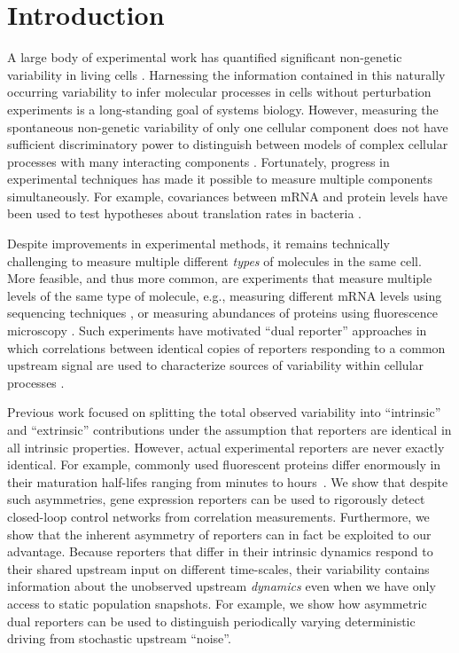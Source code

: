 \documentclass[%
 reprint,prx,
superscriptaddress,
%
%
%
%
%
%
%
%
%
 amsmath,amssymb,
 aps,
%
%
%
%
%
%
]{revtex4-2}
\begin{document}
\section{Introduction}
\vspace{-1.5em}
A large body of experimental work has quantified significant non-genetic variability in living cells \cite{Thattai2001, Ozbudak2002, Blake2003, Bar-Even2006, Newman2006, Eldar2010,elf2018,kaern2005}. Harnessing the information contained in this naturally occurring variability to infer molecular processes in cells without perturbation experiments is a long-standing goal of systems biology. However, 
%
measuring the spontaneous non-genetic variability of only one cellular component does not have sufficient discriminatory power to distinguish between models of complex cellular processes with many interacting components \cite{hilfinger2015b}.  Fortunately, progress in experimental techniques has made it possible to measure multiple components simultaneously. 
%
For example, covariances between mRNA and protein levels have been used to test hypotheses about translation rates in bacteria \cite{Taniguchi2010}. 

Despite improvements in experimental methods, it remains technically challenging to measure multiple different \emph{types} of molecules in the same cell. More feasible, and thus more common, are experiments that measure multiple levels of the same type of molecule, e.g., measuring different mRNA levels using sequencing techniques \cite{Cai2014}, or measuring abundances of proteins using fluorescence microscopy \cite{Elowitz2002}. Such experiments have motivated ``dual reporter'' approaches in which correlations between identical copies of reporters responding to a common upstream signal are used to characterize sources of variability within cellular processes \cite{Elowitz2002, Raser2004, maamar2007}.


Previous work focused on splitting the total observed variability into ``intrinsic'' and ``extrinsic'' contributions under the assumption that reporters are identical in all intrinsic properties. However, actual experimental reporters are never exactly identical. For example, commonly used fluorescent proteins differ enormously in their maturation half-lifes ranging from minutes to \mbox{hours \cite{Balleza2018}}. We show that despite such asymmetries, gene expression reporters can be used to rigorously detect closed-loop control networks from correlation measurements. Furthermore, we show that the inherent asymmetry of reporters can in fact be exploited to our advantage. Because reporters that differ in their intrinsic dynamics respond to their shared upstream input on different time-scales, their variability contains information about the unobserved upstream \emph{dynamics} even when we have only access to static population snapshots. For example, we show how asymmetric dual reporters can be used to distinguish periodically varying deterministic driving from stochastic upstream ``noise''. 
%
\end{document}
